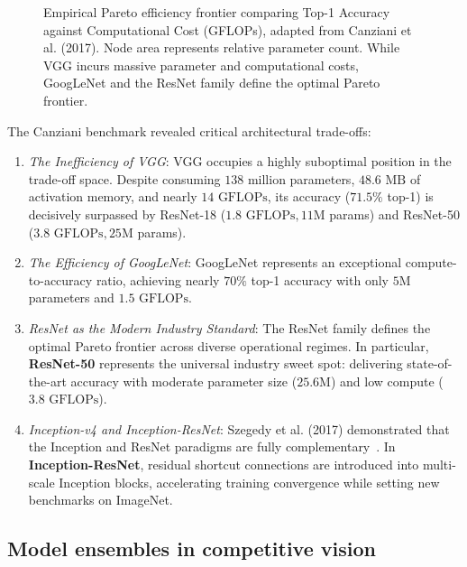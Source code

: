 \begin{figure}[H]
\caption{Empirical Pareto efficiency frontier comparing Top-1 Accuracy against Computational Cost (GFLOPs), adapted from Canziani et al. (2017). Node area represents relative parameter count. While VGG incurs massive parameter and computational costs, GoogLeNet and the ResNet family define the optimal Pareto frontier.}
\label{fig:canziani_pareto_schematic}
\end{figure}

The Canziani benchmark revealed critical architectural trade-offs:
\begin{enumerate}[leftmargin=*]
  \item \textit{The Inefficiency of VGG}: VGG occupies a highly suboptimal position in the trade-off space. Despite consuming $138$ million parameters, $48.6\text{ MB}$ of activation memory, and nearly $14\text{ GFLOPs}$, its accuracy ($71.5\%$ top-1) is decisively surpassed by ResNet-18 ($1.8\text{ GFLOPs}, 11\text{M}$ params) and ResNet-50 ($3.8\text{ GFLOPs}, 25\text{M}$ params).
  \item \textit{The Efficiency of GoogLeNet}: GoogLeNet represents an exceptional compute-to-accuracy ratio, achieving nearly $70\%$ top-1 accuracy with only $5\text{M}$ parameters and $1.5\text{ GFLOPs}$.
  \item \textit{ResNet as the Modern Industry Standard}: The ResNet family defines the optimal Pareto frontier across diverse operational regimes. In particular, \textbf{ResNet-50} represents the universal industry sweet spot: delivering state-of-the-art accuracy with moderate parameter size ($25.6\text{M}$) and low compute ($3.8\text{ GFLOPs}$).
  \item \textit{Inception-v4 and Inception-ResNet}: Szegedy et al. (2017) demonstrated that the Inception and ResNet paradigms are fully complementary~\cite{szegedy2017inception}. In \textbf{Inception-ResNet}, residual shortcut connections are introduced into multi-scale Inception blocks, accelerating training convergence while setting new benchmarks on ImageNet.
\end{enumerate}

\subsection{Model ensembles in competitive vision}
\label{sec:imagenet_model_ensembles}

